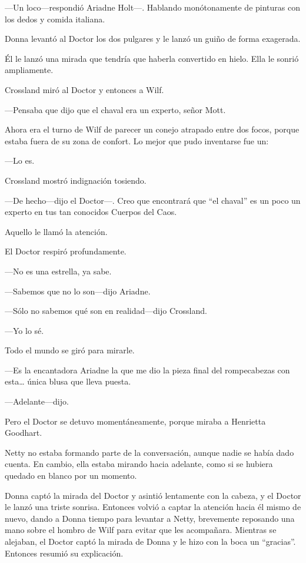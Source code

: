 ---Un loco---respondió Ariadne Holt---. Hablando monótonamente de
pinturas con los dedos y comida italiana.

Donna levantó al Doctor los dos pulgares y le lanzó un guiño de forma
exagerada.

Él le lanzó una mirada que tendría que haberla convertido en hielo. Ella
le sonrió ampliamente.

Crossland miró al Doctor y entonces a Wilf.

---Pensaba que dijo que el chaval era un experto, señor Mott.

Ahora era el turno de Wilf de parecer un conejo atrapado entre dos
focos, porque estaba fuera de su zona de confort. Lo mejor que pudo
inventarse fue un:

---Lo es.

Crossland mostró indignación tosiendo.

---De hecho---dijo el Doctor---. Creo que encontrará que ``el chaval''
es un poco un experto en tus tan conocidos Cuerpos del Caos.

Aquello le llamó la atención.

El Doctor respiró profundamente.

---No es una estrella, ya sabe.

---Sabemos que no lo son---dijo Ariadne.

---Sólo no sabemos qué son en realidad---dijo Crossland.

---Yo lo sé.

Todo el mundo se giró para mirarle.

---Es la encantadora Ariadne la que me dio la pieza final del
rompecabezas con esta\ldots{} única blusa que lleva puesta.

---Adelante---dijo.

Pero el Doctor se detuvo momentáneamente, porque miraba a Henrietta
Goodhart.

Netty no estaba formando parte de la conversación, aunque nadie se había
dado cuenta. En cambio, ella estaba mirando hacia adelante, como si se
hubiera quedado en blanco por un momento.

Donna captó la mirada del Doctor y asintió lentamente con la cabeza, y
el Doctor le lanzó una triste sonrisa. Entonces volvió a captar la
atención hacia él mismo de nuevo, dando a Donna tiempo para levantar a
Netty, brevemente reposando una mano sobre el hombro de Wilf para evitar
que les acompañara. Mientras se alejaban, el Doctor captó la mirada de
Donna y le hizo con la boca un ``gracias''. Entonces resumió su
explicación.

